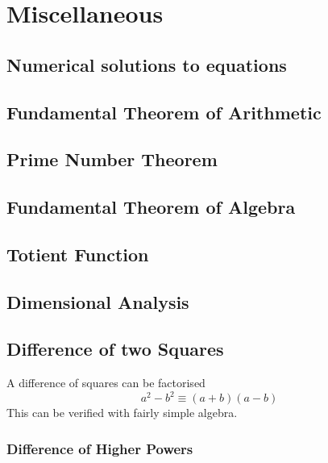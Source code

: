 \documentclass[fleqn,a4paper,11pt]{article}
\newtheorem{thm}{Theorem}
\begin{document}
    \section{Miscellaneous}

%

    \subsection{Numerical solutions to equations}

    \subsection{Fundamental Theorem of Arithmetic}

    \subsection{Prime Number Theorem}

    \subsection{Fundamental Theorem of Algebra}

    \subsection{Totient Function} \label{sec:totient}

    \subsection{Dimensional Analysis}

    \subsection{Difference of two Squares}

    A difference of squares can be factorised
    \begin{equation}
    a^2 - b^2 \equiv (a + b)(a - b)
    \end{equation}
    This can be verified with fairly simple
    algebra.

    \subsubsection{Difference of Higher Powers}
\end{document}

